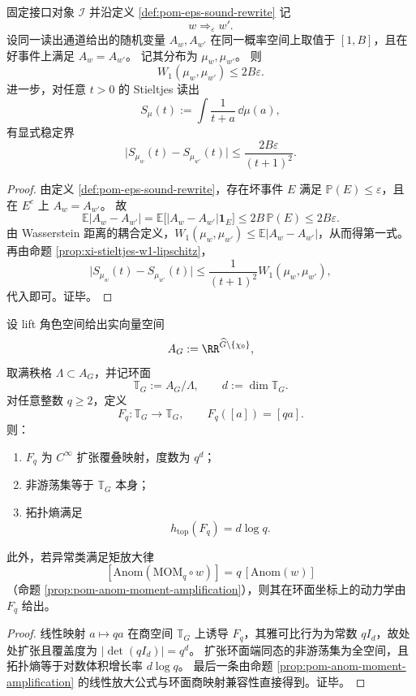 \begin{theorem}\label{thm:conclusion-epssound-w1-stieltjes-stability}
固定接口对象 \(\mathcal I\) 并沿定义 \ref{def:pom-eps-sound-rewrite} 记
\[
w\Longrightarrow_\varepsilon w'.
\]
设同一读出通道给出的随机变量 \(A_w,A_{w'}\) 在同一概率空间上取值于 \([1,B]\)，且在好事件上满足 \(A_w=A_{w'}\)。
记其分布为 \(\mu_w,\mu_{w'}\)。
则
\[
W_1(\mu_w,\mu_{w'})\le 2B\varepsilon.
\]
进一步，对任意 \(t>0\) 的 Stieltjes 读出
\[
S_{\mu}(t):=\int\frac{1}{t+a}\,\dd\mu(a),
\]
有显式稳定界
\[
\bigl|S_{\mu_w}(t)-S_{\mu_{w'}}(t)\bigr|
\le
\frac{2B\varepsilon}{(t+1)^2}.
\]
\end{theorem}
\begin{proof}
由定义 \ref{def:pom-eps-sound-rewrite}，存在坏事件 \(E\) 满足 \(\mathbb P(E)\le\varepsilon\)，且在 \(E^c\) 上 \(A_w=A_{w'}\)。
故
\[
\mathbb E|A_w-A_{w'}|
=\mathbb E\!\bigl[|A_w-A_{w'}|\mathbf 1_E\bigr]
\le 2B\,\mathbb P(E)\le 2B\varepsilon.
\]
由 Wasserstein 距离的耦合定义，\(W_1(\mu_w,\mu_{w'})\le \mathbb E|A_w-A_{w'}|\)，从而得第一式。
再由命题 \ref{prop:xi-stieltjes-w1-lipschitz}，
\[
\bigl|S_{\mu_w}(t)-S_{\mu_{w'}}(t)\bigr|
\le \frac{1}{(t+1)^2}W_1(\mu_w,\mu_{w'}),
\]
代入即可。证毕。
\end{proof}

\begin{theorem}[异常放大在环面上的扩张动力学与熵律]\label{thm:conclusion-anomaly-torus-expanding-entropy}
设 lift 角色空间给出实向量空间
\[
A_G:=\RR^{\widehat G\setminus\{\chi_0\}},
\]
取满秩格 \(\Lambda\subset A_G\)，并记环面
\[
\mathbb T_G:=A_G/\Lambda,\qquad d:=\dim\mathbb T_G.
\]
对任意整数 \(q\ge 2\)，定义
\[
F_q:\mathbb T_G\to\mathbb T_G,\qquad F_q([a])=[qa].
\]
则：
\begin{enumerate}
  \item \(F_q\) 为 \(C^\infty\) 扩张覆叠映射，度数为 \(q^d\)；
  \item 非游荡集等于 \(\mathbb T_G\) 本身；
  \item 拓扑熵满足
  \[
  h_{\mathrm{top}}(F_q)=d\log q.
  \]
\end{enumerate}
此外，若异常类满足矩放大律
\[
[\mathrm{Anom}(\mathrm{MOM}_q\circ w)]=q\,[\mathrm{Anom}(w)]
\]
（命题 \ref{prop:pom-anom-moment-amplification}），则其在环面坐标上的动力学由 \(F_q\) 给出。
\end{theorem}
\begin{proof}
线性映射 \(a\mapsto qa\) 在商空间 \(\mathbb T_G\) 上诱导 \(F_q\)，其雅可比行为为常数 \(qI_d\)，故处处扩张且覆盖度为 \(|\det(qI_d)|=q^d\)。
扩张环面端同态的非游荡集为全空间，且拓扑熵等于对数体积增长率 \(d\log q\)。
最后一条由命题 \ref{prop:pom-anom-moment-amplification} 的线性放大公式与环面商映射兼容性直接得到。证毕。
\end{proof}

